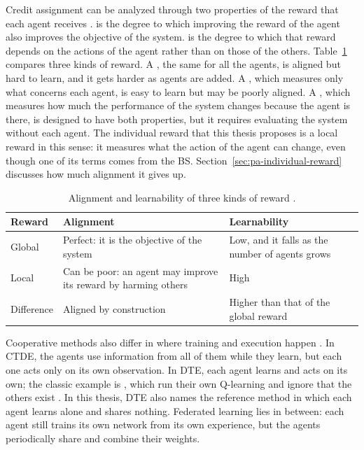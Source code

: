 Credit assignment can be analyzed through two properties of the reward that each agent receives
\cite{wolpert+01collectives,agogino+08rewards}.  is the degree to which improving the
reward of the agent also improves the objective of the system.  is the degree to which
that reward depends on the actions of the agent rather than on those of the others.
Table~\ref{tab:bg-rewards} compares three kinds of reward. A , the same for all the
agents, is aligned but hard to learn, and it gets harder as agents are added. A ,
which measures only what concerns each agent, is easy to learn but may be poorly aligned. A
, which measures how much the performance of the system changes because the
agent is there, is designed to have both properties, but it requires evaluating the system without each
agent. The individual reward that this thesis proposes is a local reward in this sense: it measures what the
action of the agent can change, even though one of its terms comes from the \ac{BS}.
Section~\ref{sec:pa-individual-reward} discusses how much alignment it gives up.

\begin{table}[htbp]
  \centering
  \caption[Alignment and learnability of three kinds of reward]{Alignment and learnability of three kinds
    of reward \cite{wolpert+01collectives,agogino+08rewards}.}
  \label{tab:bg-rewards}
  \begin{tabularx}{\linewidth}{@{}l >{\raggedright\arraybackslash}X >{\raggedright\arraybackslash}X@{}}
    \toprule
    Reward & Alignment & Learnability \\
    \midrule
    Global & Perfect: it is the objective of the system & Low, and it falls as the number of agents
      grows \\
    Local & Can be poor: an agent may improve its reward by harming others & High \\
    Difference & Aligned by construction & Higher than that of the global reward \\
    \bottomrule
  \end{tabularx}
\end{table}

Cooperative methods also differ in where training and execution happen \cite{amato24cooperative}. In
\ac{CTDE}, the agents use information from all of them while they learn, but each one acts only on its own
observation. In \ac{DTE}, each agent learns and acts on its own; the classic example is
, which run their own Q-learning and ignore that the others exist
\cite{tan93independent}. In this thesis, \ac{DTE} also names the reference method in which
each agent learns alone and shares nothing. Federated learning lies in between: each agent still trains its
own network from its own experience, but the agents periodically share and combine their weights.

